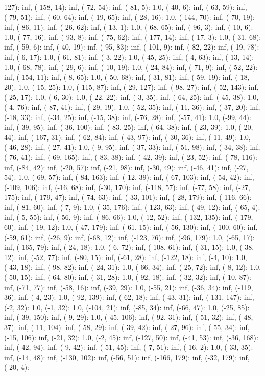 \documentclass[parskip=half]{scrartcl}
\begin{document}
127): inf, (-158, 14): inf, (-72, 54): inf, (-81, 5): 1.0, (-40, 6): inf, (-63, 59): inf, (-79, 51): inf, (-60, 64): inf, (-19, 65): inf, (-28, 16): 1.0, (-144, 70): inf, (-70, 19): inf, (-86, 11): inf, (-26, 62): inf, (-13, 1): 1.0, (-68, 65): inf, (-96, 3): inf, (-10, 6): 1.0, (-77, 16): inf, (-93, 8): inf, (-75, 62): inf, (-177, 14): inf, (-17, 3): 1.0, (-31, 68): inf, (-59, 6): inf, (-40, 19): inf, (-95, 83): inf, (-101, 9): inf, (-82, 22): inf, (-19, 78): inf, (-6, 17): 1.0, (-61, 81): inf, (-3, 22): 1.0, (-45, 25): inf, (-4, 63): inf, (-13, 14): 1.0, (-68, 78): inf, (-29, 6): inf, (-10, 19): 1.0, (-24, 84): inf, (-71, 9): inf, (-52, 22): inf, (-154, 11): inf, (-8, 65): 1.0, (-50, 68): inf, (-31, 81): inf, (-59, 19): inf, (-18, 20): 1.0, (-15, 25): 1.0, (-115, 87): inf, (-29, 127): inf, (-98, 27): inf, (-52, 143): inf, (-25, 17): 1.0, (-6, 30): 1.0, (-22, 22): inf, (-3, 35): inf, (-64, 25): inf, (-45, 38): 1.0, (-4, 76): inf, (-87, 41): inf, (-29, 19): 1.0, (-52, 35): inf, (-11, 36): inf, (-37, 20): inf, (-18, 33): inf, (-34, 25): inf, (-15, 38): inf, (-76, 28): inf, (-57, 41): 1.0, (-99, 44): inf, (-39, 95): inf, (-36, 100): inf, (-83, 25): inf, (-64, 38): inf, (-23, 39): 1.0, (-20, 44): inf, (-167, 31): inf, (-62, 84): inf, (-43, 97): inf, (-30, 36): inf, (-11, 49): 1.0, (-46, 28): inf, (-27, 41): 1.0, (-9, 95): inf, (-37, 33): inf, (-51, 98): inf, (-34, 38): inf, (-76, 41): inf, (-69, 165): inf, (-83, 38): inf, (-42, 39): inf, (-23, 52): inf, (-78, 116): inf, (-84, 42): inf, (-20, 57): inf, (-21, 98): inf, (-30, 49): inf, (-46, 41): inf, (-27, 54): 1.0, (-69, 57): inf, (-84, 163): inf, (-12, 39): inf, (-67, 103): inf, (-54, 42): inf, (-109, 106): inf, (-16, 68): inf, (-30, 170): inf, (-118, 57): inf, (-77, 58): inf, (-27, 175): inf, (-179, 47): inf, (-74, 63): inf, (-33, 101): inf, (-28, 179): inf, (-116, 66): inf, (-81, 60): inf, (-7, 9): 1.0, (-35, 176): inf, (-123, 63): inf, (-49, 12): inf, (-65, 4): inf, (-5, 55): inf, (-56, 9): inf, (-86, 66): 1.0, (-12, 52): inf, (-132, 135): inf, (-179, 60): inf, (-19, 12): 1.0, (-47, 179): inf, (-61, 15): inf, (-56, 130): inf, (-100, 60): inf, (-59, 61): inf, (-26, 9): inf, (-68, 12): inf, (-123, 76): inf, (-96, 179): 1.0, (-65, 17): inf, (-165, 79): inf, (-24, 18): 1.0, (-6, 72): inf, (-108, 61): inf, (-31, 15): 1.0, (-38, 12): inf, (-52, 77): inf, (-80, 15): inf, (-61, 28): inf, (-122, 18): inf, (-4, 10): 1.0, (-43, 18): inf, (-98, 82): inf, (-24, 31): 1.0, (-66, 34): inf, (-25, 72): inf, (-8, 12): 1.0, (-50, 15): inf, (-64, 80): inf, (-31, 28): 1.0, (-92, 18): inf, (-32, 32): inf, (-10, 87): inf, (-71, 77): inf, (-58, 16): inf, (-39, 29): 1.0, (-55, 21): inf, (-36, 34): inf, (-119, 36): inf, (-4, 23): 1.0, (-92, 139): inf, (-62, 18): inf, (-43, 31): inf, (-131, 147): inf, (-2, 32): 1.0, (-1, 32): 1.0, (-104, 21): inf, (-85, 34): inf, (-66, 47): 1.0, (-25, 85): inf, (-39, 150): inf, (-9, 29): 1.0, (-45, 106): inf, (-92, 31): inf, (-51, 32): inf, (-48, 37): inf, (-11, 104): inf, (-58, 29): inf, (-39, 42): inf, (-27, 96): inf, (-55, 34): inf, (-15, 106): inf, (-21, 32): 1.0, (-2, 45): inf, (-127, 50): inf, (-41, 53): inf, (-36, 168): inf, (-42, 94): inf, (-9, 42): inf, (-51, 45): inf, (-7, 51): inf, (-16, 2): 1.0, (-33, 35): inf, (-14, 48): inf, (-130, 102): inf, (-56, 51): inf, (-166, 179): inf, (-32, 179): inf, (-20, 4): 
\end{document}
